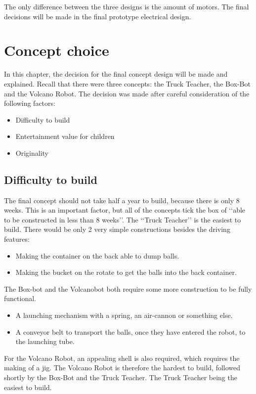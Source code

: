 \documentclass[11pt,twoside,a4paper]{report}
\begin{document}
The only difference between the three designs is the amount of motors. The final decisions will be made in the final prototype electrical design.


\chapter{Concept choice}
In this chapter, the decision for the final concept design will be made and explained. Recall that there were three concepts: the Truck Teacher, the Box-Bot and the Volcano Robot. The decision was made after careful consideration of the following factors:
\begin{itemize}
\item Difficulty to build
\item Entertainment value for children
\item Originality
\end{itemize}
\section{Difficulty to build}
The final concept should not take half a year to build, because there is only 8 weeks. This is an important factor, but all of the concepts tick the box of \lq\lq{}able to be constructed in less than 8 weeks\rq\rq{}. The \lq\lq{}Truck Teacher\rq\rq{} is the easiest to build. There would be only 2 very simple constructions besides the driving features:
\begin{itemize}
\item Making the container on the back able to dump balls.
\item Making the bucket on the rotate to get the balls into the back container.
\end{itemize}
The Box-bot and the Volcanobot both require some more construction to be fully functional.
\begin{itemize}
\item A launching mechanism with a spring, an air-cannon or something else.
\item A conveyor belt to transport the balls, once they have entered the robot, to the launching tube.
\end{itemize}
For the Volcano Robot, an appealing shell is also required, which requires the making of a jig. The Volcano Robot is therefore the hardest to build, followed shortly by the Box-Bot and the Truck Teacher. The Truck Teacher being the easiest to build.
\end{document}
